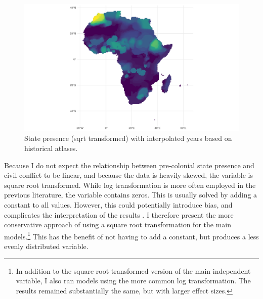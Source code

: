 \documentclass[12pt]{article}
\begin{document}

\begin{figure}[htpb]
	\centering
	\includegraphics[width=\linewidth]{../R/Output/sqrtSpAll.pdf}
	\caption{State presence (sqrt transformed) with interpolated years based
	on historical atlases.}
	\label{Sp_i}
\end{figure}


Because I do not expect the relationship between pre-colonial state presence and
civil conflict to be linear, and because the data is heavily skewed, the
variable is square root transformed. While log transformation is more often
employed in the previous literature, the variable contains zeros. This is
usually solved by adding a constant to all values. However, this could
potentially introduce bias, and complicates the interpretation of the results
\citep{Ekwaru_2018}. I therefore present the more conservative approach of using
a square root transformation for the main models.\footnote{In addition to the
	square root transformed version of the main independent variable, I also
	ran models using the more common log transformation. The results
remained substantially the same, but with larger effect sizes.} This has the
benefit of not having to add a constant, but produces a less evenly distributed
variable. 
\end{document}
